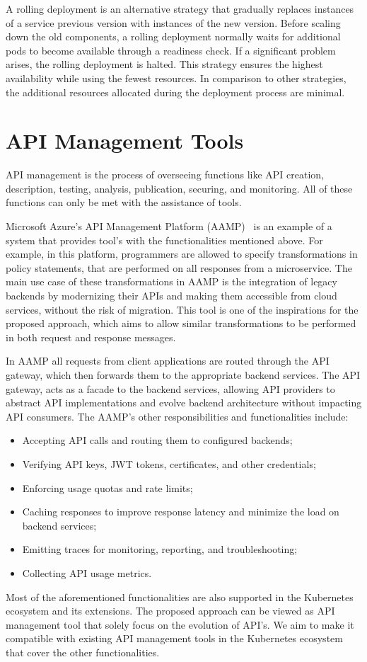 A rolling deployment is an alternative strategy that gradually replaces instances of a service previous version with instances of the new version.
Before scaling down the old components, a rolling deployment normally waits for additional pods to become available through a readiness check.
If a significant problem arises, the rolling deployment is halted.
This strategy ensures the highest availability while using the fewest resources.
In comparison to other strategies, the additional resources allocated during the deployment process are minimal.

\section{API Management Tools} %
\label{sec:api_management_tools}

API management is the process of overseeing functions like API creation, description, testing, analysis, publication, securing, and monitoring.
All of these functions can only be met with the assistance of tools.

Microsoft Azure's API Management Platform (AAMP)~\cite{azureapi} is an example of a system that provides tool's with the functionalities mentioned above.
For example, in this platform, programmers are allowed to specify transformations in policy statements, that are performed on all responses from a microservice.
The main use case of these transformations in AAMP is the integration of legacy backends by modernizing their APIs and making them accessible from cloud services, without the risk of migration.
This tool is one of the inspirations for the proposed approach, which aims to allow similar transformations to be
performed in both request and response messages.

In AAMP all requests from client applications are routed through the API gateway, which then forwards them to the appropriate backend services.
The API gateway, acts as a facade to the backend services,
allowing API providers to abstract API implementations and evolve backend architecture without impacting API consumers.
The AAMP's other responsibilities and functionalities include:
\begin{itemize}
    \setlength\itemsep{0em}
    \item Accepting API calls and routing them to configured backends;
    \item Verifying API keys, JWT tokens, certificates, and other credentials;
    \item Enforcing usage quotas and rate limits;
    \item Caching responses to improve response latency and minimize the load on backend services;
    \item Emitting traces for monitoring, reporting, and troubleshooting;
    \item Collecting API usage metrics.
\end{itemize}

Most of the aforementioned functionalities are also supported in the Kubernetes ecosystem and its extensions.
The proposed approach can be viewed as API management tool that solely focus on the evolution of API's.
We aim to make it compatible with existing API management tools in the Kubernetes ecosystem that cover the other functionalities.
